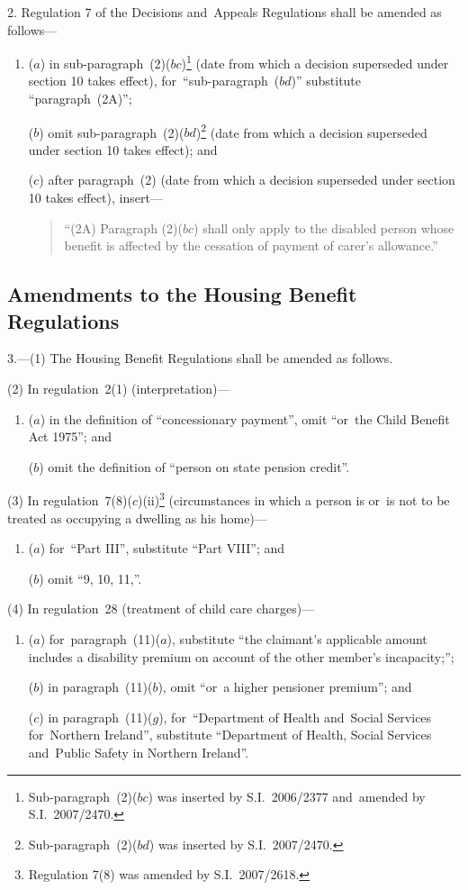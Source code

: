 \documentclass[12pt,a4paper]{article}
\begin{document}
2.  Regulation 7 of the Decisions and~Appeals Regulations shall be amended as follows—
\begin{enumerate}\item[]
($a$) in sub-paragraph~(2)($bc$)\footnote{Sub-paragraph~(2)($bc$)  was inserted by S.I.~2006/2377 and~amended by S.I.~2007/2470.} (date from which a decision superseded under section 10 takes effect), for~“sub-paragraph~($bd$)” substitute “paragraph~(2A)”;

($b$) omit sub-paragraph~(2)($bd$)\footnote{Sub-paragraph~(2)($bd$)  was inserted by S.I.~2007/2470.} (date from which a decision superseded under section 10 takes effect); and

($c$) after paragraph~(2) (date from which a decision superseded under section 10 takes effect), insert—
\begin{quotation}
“(2A) Paragraph (2)($bc$)  shall only apply to the disabled person whose benefit is affected by the cessation of payment of carer’s allowance.”
\end{quotation}
\end{enumerate}

\subsection[3. Amendments to the Housing Benefit Regulations]{Amendments to the Housing Benefit Regulations}

3.---(1)  The Housing Benefit Regulations shall be amended as follows.

(2) In regulation~2(1) (interpretation)—
\begin{enumerate}\item[]
($a$) in the definition of “concessionary payment”, omit “or~the Child Benefit Act 1975”; and

($b$) omit the definition of “person on state pension credit”.
\end{enumerate}

(3) In regulation~7(8)($c$)(ii)\footnote{Regulation 7(8) was amended by S.I.~2007/2618.} (circumstances in which a person is or~is not to be treated as occupying a dwelling as his home)—
\begin{enumerate}\item[]
($a$) for~“Part III”, substitute “Part VIII”; and

($b$) omit “9, 10, 11,”.
\end{enumerate}

(4) In regulation~28 (treatment of child care charges)—
\begin{enumerate}\item[]
($a$) for~paragraph~(11)($a$), substitute “the claimant’s applicable amount includes a disability premium on account of the other member’s incapacity;”;

($b$) in paragraph~(11)($b$), omit “or~a higher pensioner premium”; and

($c$) in paragraph~(11)($g$), for~“Department of Health and~Social Services for~Northern Ireland”, substitute “Department of Health, Social Services and~Public Safety in Northern Ireland”.
\end{enumerate}
\end{document}

